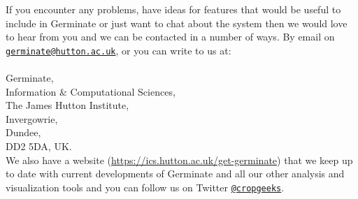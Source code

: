 If you encounter any problems, have ideas for features that would be useful to include in Germinate or just want to chat about the system then we would love to hear from you and we can be contacted in a number of ways. By email on \href{mailto:germinate@hutton.ac.uk}{\nolinkurl{germinate@hutton.ac.uk}}, or you can write to us at: \\
\\
Germinate,\\ 
Information \& Computational Sciences, \\
The James Hutton Institute, \\
Invergowrie, \\
Dundee, \\
DD2 5DA, UK. \\

\noindent
We also have a website (\url{https://ics.hutton.ac.uk/get-germinate}) that we keep up to date with current developments of Germinate and all our other analysis and visualization tools and you can follow us on Twitter \href{https://twitter.com/cropgeeks}{\nolinkurl{@cropgeeks}}.